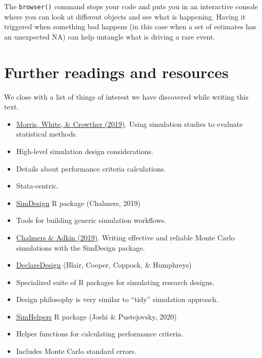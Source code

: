 \documentclass[
]{book}
\begin{document}
The \texttt{browser()} command stops your code and puts you in an interactive console where you can look at different objects and see what is happening.
Having it triggered when something bad happens (in this case when a set of estimates has an unexpected NA) can help untangle what is driving a rare event.

\chapter{Further readings and resources}\label{further-readings-and-resources}

We close with a list of things of interest we have discovered while writing this text.

\begin{itemize}
\item
  \href{https://doi.org/10.1002/sim.8086}{Morris, White, \& Crowther (2019)}. Using simulation studies to evaluate statistical methods.
\item
  High-level simulation design considerations.
\item
  Details about performance criteria calculations.
\item
  Stata-centric.
\item
  \href{https://github.com/philchalmers/SimDesign/wiki}{SimDesign} R package (Chalmers, 2019)
\item
  Tools for building generic simulation workflows.
\item
  \href{http://www.tqmp.org/RegularArticles/vol16-4/p248/}{Chalmers \& Adkin (2019)}. Writing effective and reliable Monte Carlo simulations with the SimDesign package.
\item
  \href{https://declaredesign.org/}{DeclareDesign} (Blair, Cooper, Coppock, \& Humphreys)
\item
  Specialized suite of R packages for simulating research designs.
\item
  Design philosophy is very similar to ``tidy'' simulation approach.
\item
  \href{https://meghapsimatrix.github.io/simhelpers/index.html}{SimHelpers} R package (Joshi \& Pustejovsky, 2020)
\item
  Helper functions for calculating performance criteria.
\item
  Includes Monte Carlo standard errors.
\end{itemize}

  
\end{document}
